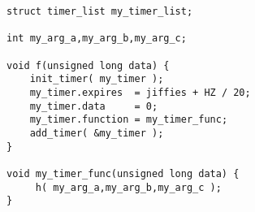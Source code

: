 \documentclass[a4j,9pt]{jsarticle}
\begin{document}
\begin{lstlisting}
struct timer_list my_timer_list;

int my_arg_a,my_arg_b,my_arg_c;

void f(unsigned long data) {
    init_timer( my_timer );
    my_timer.expires  = jiffies + HZ / 20;
    my_timer.data     = 0;
    my_timer.function = my_timer_func;
    add_timer( &my_timer );
}

void my_timer_func(unsigned long data) {
     h( my_arg_a,my_arg_b,my_arg_c );
}
\end{lstlisting}
\end{document}
